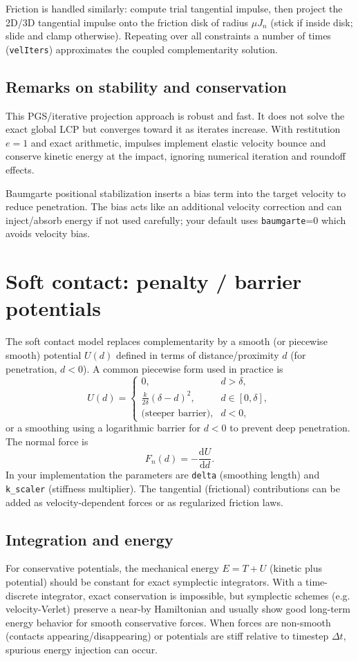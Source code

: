 \documentclass[11pt,a4paper]{article}
\begin{document}
Friction is handled similarly: compute trial tangential impulse, then project the 2D/3D tangential impulse onto the friction disk of radius $\mu J_n$ (stick if inside disk; slide and clamp otherwise). Repeating over all constraints a number of times (\texttt{velIters}) approximates the coupled complementarity solution.

\subsection{Remarks on stability and conservation}
This PGS/iterative projection approach is robust and fast. It does not solve the exact global LCP but converges toward it as iterates increase. With restitution $e=1$ and exact arithmetic, impulses implement elastic velocity bounce and conserve kinetic energy at the impact, ignoring numerical iteration and roundoff effects.

Baumgarte positional stabilization inserts a bias term into the target velocity to reduce penetration. The bias acts like an additional velocity correction and can inject/absorb energy if not used carefully; your default uses \texttt{baumgarte}=0 which avoids velocity bias.

\section{Soft contact: penalty / barrier potentials}
The soft contact model replaces complementarity by a smooth (or piecewise smooth) potential $U(d)$ defined in terms of distance/proximity $d$ (for penetration, $d<0$). A common piecewise form used in practice is
\[ U(d) = \begin{cases}
    0, & d > \delta, \\[4pt]
    \frac{k}{2\delta} (\delta - d)^2, & d \in [0,\delta], \\[4pt]
    \text{(steeper barrier)}, & d < 0,
\end{cases} \]
or a smoothing using a logarithmic barrier for $d<0$ to prevent deep penetration. The normal force is
\[ F_n(d) = -\frac{\mathrm{d}U}{\mathrm{d}d}. \]
In your implementation the parameters are \texttt{delta} (smoothing length) and \texttt{k\_scaler} (stiffness multiplier). The tangential (frictional) contributions can be added as velocity-dependent forces or as regularized friction laws.

\subsection{Integration and energy}
For conservative potentials, the mechanical energy $E = T + U$ (kinetic plus potential) should be constant for exact symplectic integrators. With a time-discrete integrator, exact conservation is impossible, but symplectic schemes (e.g. velocity-Verlet) preserve a near-by Hamiltonian and usually show good long-term energy behavior for smooth conservative forces. When forces are non-smooth (contacts appearing/disappearing) or potentials are stiff relative to timestep $\Delta t$, spurious energy injection can occur.
\end{document}
